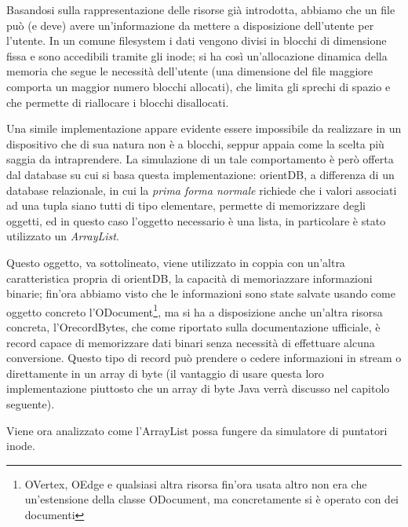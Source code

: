 Basandosi sulla rappresentazione delle risorse già introdotta, abbiamo che un file può (e deve) avere un'informazione da mettere a disposizione dell'utente per l'utente. In un comune filesystem i dati vengono divisi in blocchi di dimensione fissa e sono accedibili tramite gli inode; si ha così un'allocazione dinamica della memoria che segue le necessità dell'utente (una dimensione del file maggiore comporta un maggior numero blocchi allocati), che limita gli sprechi di spazio e che permette di riallocare i blocchi disallocati.

Una simile implementazione appare evidente essere impossibile da realizzare in un dispositivo che di sua natura non è a blocchi, seppur appaia come la scelta più saggia da intraprendere. La simulazione di un tale comportamento è però offerta dal database su cui si basa questa implementazione: orientDB, a differenza di un database relazionale, in cui la \emph{prima forma normale} richiede che i valori associati ad una tupla siano tutti di tipo elementare, permette di memorizzare degli oggetti, ed in questo caso l'oggetto necessario è una lista, in particolare è stato utilizzato un \emph{ArrayList}.

Questo oggetto, va sottolineato, viene utilizzato in coppia con un'altra caratteristica propria di orientDB, la capacità di memoriazzare informazioni binarie; fin'ora abbiamo visto che le informazioni sono state salvate usando come oggetto concreto l'ODocument\footnote{OVertex, OEdge e qualsiasi altra risorsa fin'ora usata altro non era che un'estensione della classe ODocument, ma concretamente si è operato con dei documenti}, ma si ha a disposizione anche un'altra risorsa concreta, l'OrecordBytes, che come riportato sulla documentazione ufficiale, è record capace di memorizzare dati binari senza necessità di effettuare alcuna conversione. Questo tipo di record può prendere o cedere informazioni in stream o direttamente in un array di byte (il vantaggio di usare questa loro implementazione piuttosto che un array di byte Java verrà discusso nel capitolo seguente).





Viene ora analizzato come l'ArrayList possa fungere da simulatore di puntatori inode. 